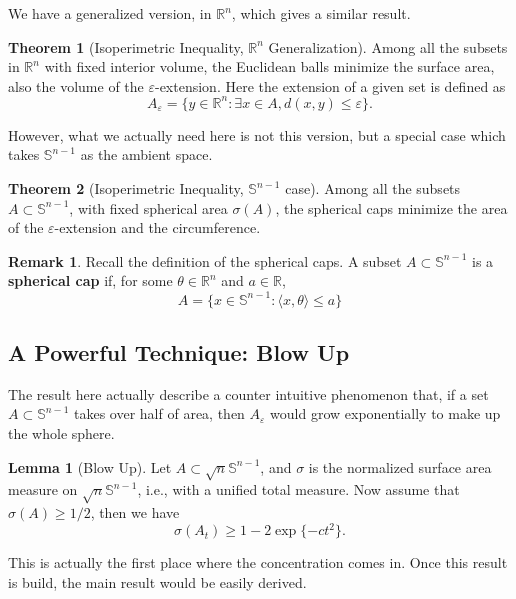 \documentclass[9pt,onesided]{article}
\newcommand{\ip}[2]{\langle #1,#2 \rangle}
\newcommand{\re}{\mathbb{R}}
\newcommand{\mc}{\color{BlueViolet}}
\renewcommand{\ge}{\geqslant}
\renewcommand{\le}{\leqslant}
\newcommand{\s}{\mathbb{S}}
\theoremstyle{definition}
\newtheorem{theorem}{\mc Theorem}
\newtheorem*{remark}{\mc Remark}
\newtheorem{lemma}{\mc Lemma}
\begin{document}
We have a generalized version, in $\re^n$, which gives a similar result.

\begin{theorem}
[Isoperimetric Inequality, $\re^n$ Generalization] Among all the subsets in $\re^n$ with fixed interior volume, the Euclidean balls minimize the surface area, also the volume of the $\varepsilon$-extension. Here the extension of a given set is defined as
$$A_{\varepsilon}=\{y\in \re^n:\exists x\in A, d(x,y)\le \varepsilon\}.$$
\end{theorem}

However, what we actually need here is not this version, but a special case which takes $\s^{n-1}$ as the ambient space.

\begin{theorem}
    [Isoperimetric Inequality, $\s^{n-1}$ case] Among all the subsets $A\subset \s^{n-1}$, with fixed spherical area $\sigma(A)$, the spherical caps minimize the area of the $\varepsilon$-extension and the circumference.
\end{theorem}

\begin{remark}
Recall the definition of the spherical caps. A subset $A\subset \s^{n-1}$ is a \textbf{spherical cap} if, for some $\theta \in \re^n$ and $a\in \re$, 
\[A=\{x\in \s^{n-1}:\ip{x}{\theta}\le a\}\]
\end{remark}

\subsection{A Powerful Technique: Blow Up}

The result here actually describe a counter intuitive phenomenon that, if a set $A\subset \s^{n-1}$ takes over half of area, then $A_{\varepsilon}$ would grow exponentially to make up the whole sphere.

\begin{lemma}
[Blow Up] \label{blowup}Let $A\subset \sqrt{n}\s^{n-1}$, and $\sigma$ is the normalized surface area measure on $\sqrt{n}\s^{n-1}$, i.e., with a unified total measure. Now assume that $\sigma(A)\ge 1/2$, then we have
\begin{equation*}
    \sigma(A_t)\ge 1- 2\exp\{ -ct^2\}.
\end{equation*}
\end{lemma}

This is actually the first place where the concentration comes in. Once this result is build, the main result would be easily derived.
\end{document}
